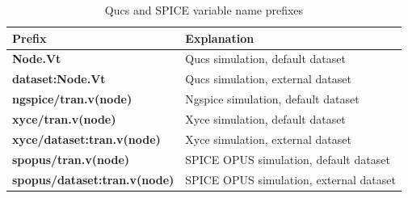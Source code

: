 \documentclass[10pt, a4paper]{report}
\begin{document}
\begin{table} [h]
	\centering	
	\caption{Qucs and SPICE variable name prefixes}
	\label{Table2}
	\begin{tabular}  {|l|l|} \hline			
		\textbf{Prefix}                      &   \textbf{Explanation} \\  
		\hline   
		\textbf{Node.Vt}                     &   Qucs simulation, default dataset   \\
		\textbf{dataset:Node.Vt}             &   Qucs simulation, external dataset     \\
		\textbf{ngspice/tran.v(node)}        &   Ngspice simulation, default dataset     \\
		\textbf{xyce/tran.v(node)}           &   Xyce simulation, default dataset  \\
		\textbf{xyce/dataset:tran.v(node)}   &   Xyce simulation, external dataset     \\
		\textbf{spopus/tran.v(node)}         &   SPICE OPUS simulation, default dataset  \\
		\textbf{spopus/dataset:tran.v(node)} &  SPICE OPUS simulation, external dataset   \\	
		\hline
	\end{tabular}
\end{table}
\end{document}
